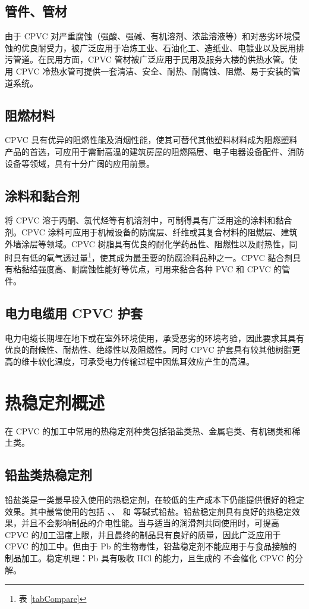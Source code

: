 \subsection{管件、管材}
由于 CPVC 对严重腐蚀（强酸、强碱、有机溶剂、浓盐溶液等）和对恶劣环境侵蚀的优良耐受力，被广泛应用于冶炼工业、石油化工、造纸业、电镀业以及民用排污管道。在民用方面，CPVC 管材被广泛应用于民用及服务大楼的供热水管。使用 CPVC 冷热水管可提供一套清洁、安全、耐热、耐腐蚀、阻燃、易于安装的管道系统。

\subsection{阻燃材料}
CPVC 具有优异的阻燃性能及消烟性能，使其可替代其他塑料材料成为阻燃塑料产品的首选，可应用于需耐高温的建筑房屋的阻燃隔层、电子电器设备配件、消防设备等领域，具有十分广阔的应用前景。

\subsection{涂料和黏合剂}
将 CPVC 溶于丙酮、氯代烃等有机溶剂中，可制得具有广泛用途的涂料和黏合剂。CPVC 涂料可应用于机械设备的防腐层、纤维或其复合材料的阻燃层、建筑外墙涂层等领域。CPVC 树脂具有优良的耐化学药品性、阻燃性以及耐热性，同时具有低的氧气透过量\footnote{表 \ref{tabCompare}}，使其成为最重要的防腐涂料品种之一。CPVC 黏合剂具有粘黏结强度高、耐腐蚀性能好等优点，可用来黏合各种 PVC 和 CPVC 的管件。

\subsection{电力电缆用 CPVC 护套}
电力电缆长期埋在地下或在室外环境使用，承受恶劣的环境考验，因此要求其具有优良的耐候性、耐热性、绝缘性以及阻燃性。同时 CPVC 护套具有较其他树脂更高的维卡软化温度，可承受电力传输过程中因焦耳效应产生的高温。

\section{热稳定剂概述}

在 CPVC 的加工中常用的热稳定剂种类包括铅盐类热、金属皂类、有机锡类和稀土类。

\subsection{铅盐类热稳定剂}
铅盐类是一类最早投入使用的热稳定剂，在较低的生产成本下仍能提供很好的稳定效果。其中最常使用的包括 、、 和  等碱式铅盐。铅盐稳定剂具有良好的热稳定效果，并且不会影响制品的介电性能。当与适当的润滑剂共同使用时，可提高 CPVC 的加工温度上限，并且最终的制品具有良好的质量，因此广泛应用于 CPVC 的加工中。但由于 Pb 的生物毒性，铅盐稳定剂不能应用于与食品接触的制品加工。稳定机理：Pb 具有吸收 HCl 的能力，且生成的  不会催化 CPVC 的分解。

